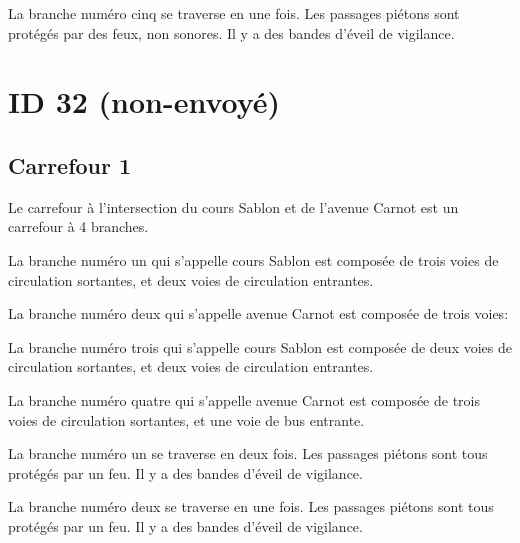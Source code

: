 \begin{appendix}
La branche numéro cinq se traverse en une fois. Les passages piétons sont protégés par des feux, non sonores.  Il y a des bandes d'éveil de vigilance.

\section*{ID 32 (non-envoyé)}

\label{annexe:q_ID32}

\subsection*{Carrefour 1}

\label{annexe:q_ID32_carrefour1}

Le carrefour à l'intersection du cours Sablon et de l'avenue Carnot est un carrefour à 4 branches.

\newpar{}

La branche numéro un qui s'appelle cours Sablon est composée de trois voies de circulation sortantes, et deux voies de circulation entrantes.

\newpar{}

La branche numéro deux qui s'appelle avenue Carnot est composée  de trois voies: 

\newpar{}

La branche numéro trois qui s'appelle cours Sablon est composée de deux voies de circulation sortantes, et deux voies de circulation entrantes. 

\newpar{}

La branche numéro quatre qui s'appelle avenue Carnot est composée de trois voies de circulation sortantes, et une voie de bus entrante. 

\newpar{}

La branche numéro un se traverse en deux fois. Les passages piétons sont tous protégés par un feu. Il y a des bandes d'éveil de vigilance.

\newpar{}

La branche numéro deux se traverse en une fois. Les passages piétons sont tous protégés par un feu. Il y a des bandes d'éveil de vigilance.


\end{appendix}

